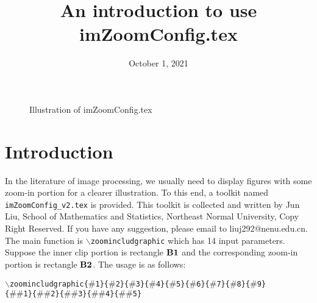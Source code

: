 \documentclass[11pt]{article}
\begin{document}
\date{October 1, 2021}
\title{An introduction to use imZoomConfig.tex}

   

\maketitle

\begin{figure}[!ht]
\centering
	\caption{Illustration of imZoomConfig.tex}
	\label{illus}
\end{figure}

\section{Introduction}

In the literature of image processing, we usually need to display figures with some zoom-in portion for a clearer illustration. To this end, a toolkit named \texttt{imZoomConfig\_v2.tex} is provided. This toolkit is collected and written by Jun Liu, School of Mathematics and Statistics, Northeast Normal University, Copy Right Reserved. If you have any suggestion, please email to liuj292@nenu.edu.cn. The main function is \texttt{$\backslash$zoomincludgraphic} which has 14 input parameters. Suppose the inner clip portion is rectangle $\rm\bf{B}1$ and the corresponding zoom-in portion is rectangle $\rm\bf{B}2$.  The usage is as follows:

\texttt{$\backslash$zoomincludgraphic\{$\#$1\}\{$\#$2\}\{$\#$3\}\{$\#$4\}\{$\#$5\}\{$\#$6\}\{$\#$7\}\{$\#$8\}\{$\#$9\}}\\ \texttt{\{$\#\#$1\}\{$\#\#$2\}\{$\#\#$3\}\{$\#\#$4\}\{$\#\#$5\}} 
\end{document}
